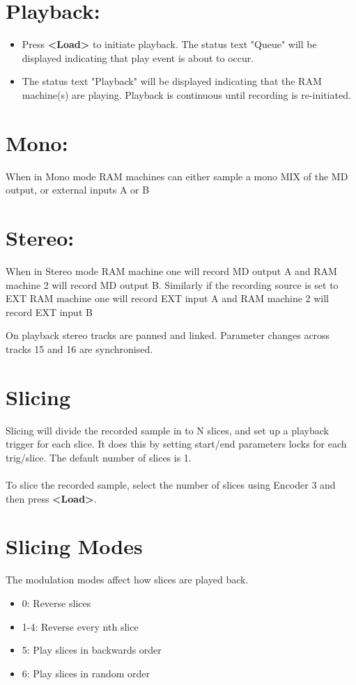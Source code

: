 \section{Playback:}
\begin{itemize}
\item Press \textbf{<Load>} to initiate playback. The status text "Queue" will be displayed indicating that play event is about to occur. 
\item The status text "Playback" will be displayed indicating that the RAM machine(s) are playing. Playback is continuous until recording is re-initiated. 
\end{itemize}


\section{Mono:}
When in Mono mode RAM machines can either sample a mono MIX of the MD output, or external inputs A or B
\section{Stereo:}
When in Stereo mode RAM machine one will record MD output A and RAM machine 2 will record MD output B. Similarly if the recording source is set to EXT RAM machine one will record EXT input A and RAM machine 2 will record EXT input B

On playback stereo tracks are panned and linked. Parameter changes across tracks 15 and 16 are synchronised.
\newpage
\section{Slicing}
Slicing will divide the recorded sample in to N slices, and set up a playback trigger for each slice. It does this by setting start/end parameters locks for each trig/slice. The default number of slices is 1.\\
\\
To slice the recorded sample, select the number of slices using Encoder 3 and then press \textbf{<Load>}.
\\

\section{Slicing Modes}

The modulation modes affect how slices are played back.
\begin{itemize}
    \item 0: Reverse slices
    \item 1-4: Reverse every nth slice
    \item 5: Play slices in backwards order
    \item 6: Play slices in random order
\end{itemize}



